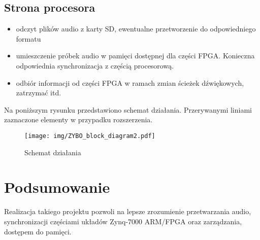 \documentclass[a4paper, 12pt]{article}
\begin{document}
\subsection{Strona procesora}
\begin{itemize}
	\item odczyt plików audio z karty SD, ewentualne przetworzenie do odpowiedniego formatu
	\item umieszczenie próbek audio w pamięci dostępnej dla części FPGA. Konieczna odpowiednia synchronizacja z częścią procesorową.
	\item odbiór informacji od części FPGA w ramach zmian ścieżek dźwiękowych, zatrzymać itd.
\end{itemize}

Na poniższym rysunku przedstawiono schemat działania. Przerywanymi liniami zaznaczone elementy w przypadku rozszerzenia.

\begin{figure}[!ht]
	\centerline{\texttt{[image: img/ZYBO\_block\_diagram2.pdf]}}
	\caption{Schemat działania}
\end{figure}

\section{Podsumowanie}
Realizacja takiego projektu pozwoli na lepsze zrozumienie przetwarzania audio, synchronizacji częściami układów Zynq-7000 ARM/FPGA oraz zarządzania, dostępem do pamięci.
\end{document}
